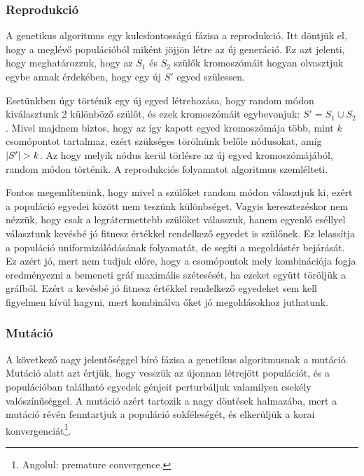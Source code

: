 \subsubsection{Reprodukció}
A genetikus algoritmus egy kulcsfontosságú fázisa a reprodukció.
Itt döntjük el, hogy a meglévő populációból miként jöjjön létre az új generáció.
Ez azt jelenti, hogy meghatározzuk, hogy az $S_{1}$ és $S_{2}$ szülők kromoszómáit
hogyan olvasztjuk egybe annak érdekében, hogy egy új $S'$ egyed szülessen.

Esetünkben úgy történik egy új egyed létrehozása, hogy random módon kiválasztunk 2 különböző szülőt,
és ezek kromoszómáit egybevonjuk: $S' = S_{1} \cup S_{2}$.
Mivel majdnem biztos, hogy az így kapott egyed kromoszómája több, mint $k$ csomópontot tartalmaz,
ezért szükséges törölnünk belőle nódusokat, amíg $\lvert S'\rvert > k$.
Az hogy melyik nódus kerül törlésre az új egyed kromoszómájából, random módon történik.
A reprodukciós folyamatot  algoritmus szemlélteti.


Fontos megemlítenünk, hogy mivel a szülőket random módon választjuk ki, ezért a populáció egyedei között nem teszünk különbséget.
Vagyis keresztezéskor nem nézzük, hogy csak a legrátermettebb szülőket válasszuk,
hanem egyenlő eséllyel választunk kevésbé jó fitnesz értékkel rendelkező egyedet is szülőnek.
Ez lelassítja a populáció uniformizálódásának folyamatát, de segíti a megoldástér bejárását.
Ez azért jó, mert nem tudjuk előre, hogy a csomópontok mely kombinációja
fogja eredményezni a bemeneti gráf maximális szétesését, ha ezeket együtt töröljük a gráfból.
Ezért a kevésbé jó fitnesz értékkel rendelkező egyedeket sem kell figyelmen kívül hagyni,
mert kombinálva őket jó megoldásokhoz juthatunk.


\subsubsection{Mutáció}
A következő nagy jelentőséggel bíró fázisa a genetikus algoritmusnak a mutáció.
Mutáció alatt azt értjük, hogy vesszük az újonnan létrejött populációt,
és a populációban található egyedek génjeit perturbáljuk valamilyen csekély valószínűséggel.
A mutáció azért tartozik a nagy döntések halmazába,
mert a mutáció révén fenntartjuk a populáció sokféleségét, és elkerüljük a korai konvergenciát\footnote{ Angolul: premature convergence. }.

